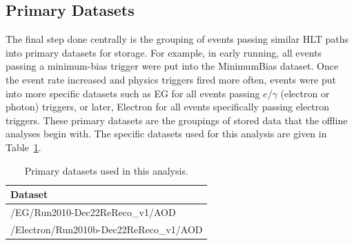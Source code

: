 



\subsection{Primary Datasets}
\label{evSel:PD}
The final step done centrally is the grouping of events passing similar 
HLT paths into primary datasets for storage.  
For example, in early running, all events passing a minimum-bias trigger 
were put into the MinimumBias dataset.  
Once the event rate increased and physics triggers fired more often, 
events were put into more specific datasets such as 
EG for all events passing $e/\gamma$ (electron or photon) triggers, 
or later, Electron for all events specifically passing 
electron triggers.  
These primary datasets are the groupings of stored data 
that the offline analyses begin with.  
The specific datasets used for this analysis are given in 
Table~\ref{TableDatasets}.  

\begin{table}[htbp]
  \begin{center}
    \caption{\fixspacing Primary datasets used in this analysis.}
    \label{TableDatasets}
    \begin{tabular}[]{ | l | }
      \hline
      Dataset  \\ \hline \hline
      /EG/Run2010-Dec22ReReco\_v1/AOD  \\ \hline
      /Electron/Run2010b-Dec22ReReco\_v1/AOD  \\ \hline
    \end{tabular}
  \end{center}
\end{table}

